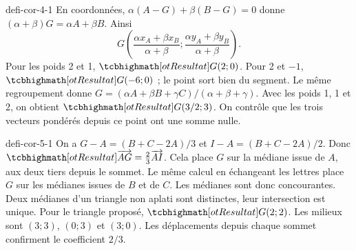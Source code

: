 \begin{blocEdition}{defi-cor-4-1}
En coordonnées, $\alpha(A-G)+\beta(B-G)=0$ donne $(\alpha+\beta)G=\alpha A+\beta B$. Ainsi
\[G\left(\frac{\alpha x_A+\beta x_B}{\alpha+\beta};\frac{\alpha y_A+\beta y_B}{\alpha+\beta}\right).\]
Pour les poids 2 et 1, $\res{G(2;0)}$. Pour 2 et $-1$, $\res{G(-6;0)}$ ; le point sort bien du segment.
Le même regroupement donne $G=(\alpha A+\beta B+\gamma C)/(\alpha+\beta+\gamma)$. Avec les poids 1, 1 et 2, on obtient $\res{G(3/2;3)}$. On contrôle que les trois vecteurs pondérés depuis ce point ont une somme nulle.
\label{fig-defi-cor-4}

\end{blocEdition}
\begin{blocEdition}{defi-cor-5-1}
On a $G-A=(B+C-2A)/3$ et $I-A=(B+C-2A)/2$. Donc $\res{\vect{AG}=\tfrac23\vect{AI}}$. Cela place $G$ sur la médiane issue de $A$, aux deux tiers depuis le sommet.
Le même calcul en échangeant les lettres place $G$ sur les médianes issues de $B$ et de $C$. Les médianes sont donc concourantes. Deux médianes d’un triangle non aplati sont distinctes, leur intersection est unique.
Pour le triangle proposé, $\res{G(2;2)}$. Les milieux sont $(3;3)$, $(0;3)$ et $(3;0)$. Les déplacements depuis chaque sommet confirment le coefficient $2/3$.
\label{fig-defi-cor-5}

\end{blocEdition}
